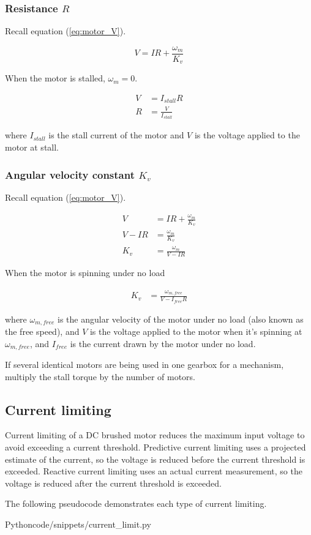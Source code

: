\subsubsection{Resistance $R$}

Recall equation (\ref{eq:motor_V}).

\begin{equation*}
  V = IR + \frac{\omega_m}{K_v}
\end{equation*}

When the motor is stalled, $\omega_m = 0$.

\begin{align}
  V &= I_{stall} R \nonumber \\
  R &= \frac{V}{I_{stall}}
\end{align}

where $I_{stall}$ is the stall current of the motor and $V$ is the voltage
applied to the motor at stall.

\subsubsection{Angular velocity constant $K_v$}

Recall equation (\ref{eq:motor_V}).

\begin{align*}
  V &= IR + \frac{\omega_m}{K_v} \\
  V - IR &= \frac{\omega_m}{K_v} \\
  K_v &= \frac{\omega_m}{V - IR}
\end{align*}

When the motor is spinning under no load

\begin{align}
  K_v &= \frac{\omega_{m,free}}{V - I_{free}R}
\end{align}

where $\omega_{m,free}$ is the angular velocity of the motor under no load (also
known as the free speed), and $V$ is the voltage applied to the motor when it's
spinning at $\omega_{m,free}$, and $I_{free}$ is the current drawn by the motor
under no load.

If several identical motors are being used in one gearbox for a mechanism,
multiply the stall torque by the number of motors.

\subsection{Current limiting}

Current limiting of a DC brushed motor reduces the maximum input voltage to
avoid exceeding a current threshold. Predictive current limiting uses a
projected estimate of the current, so the voltage is reduced before the current
threshold is exceeded. Reactive current limiting uses an actual current
measurement, so the voltage is reduced after the current threshold is exceeded.

The following pseudocode demonstrates each type of current limiting.

\begin{code}{Python}{code/snippets/current_limit.py}
  \caption{Limits current of DC motor to $I_{max}$}
  \label{lst:dc_motor_current_limit}
\end{code}

